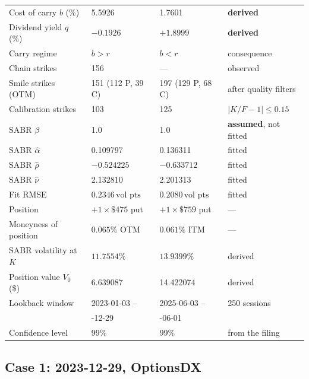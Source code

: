 \documentclass[11pt]{article}
\newcommand{\vp}{\,\text{vol pts}}
\begin{document}
\begin{table}[t]
\begin{tabular}{llll}
Cost of carry $b$ (\%)   & 5.5926             & 1.7601              & \textbf{derived} \\
Dividend yield $q$ (\%)  & $-0.1926$          & $+1.8999$           & \textbf{derived} \\
Carry regime             & $b>r$              & $b<r$               & consequence \\
\midrule
Chain strikes            & 156                & ---                 & observed \\
Smile strikes (OTM)      & 151 (112 P, 39 C)  & 197 (129 P, 68 C)   & after quality filters \\
Calibration strikes      & 103                & 125                 & $|K/F-1|\le0.15$ \\
SABR $\beta$             & 1.0                & 1.0                 & \textbf{assumed}, not fitted \\
SABR $\hat{\alpha}$      & 0.109797           & 0.136311            & fitted \\
SABR $\hat{\rho}$        & $-0.524225$        & $-0.633712$         & fitted \\
SABR $\hat{\nu}$         & 2.132810           & 2.201313            & fitted \\
Fit RMSE                 & $0.2346\vp$        & $0.2080\vp$         & fitted \\
\midrule
Position                 & $+1\times\$475$ put & $+1\times\$759$ put & --- \\
Moneyness of position    & $0.065\%$ OTM      & $0.061\%$ ITM       & --- \\
SABR volatility at $K$   & $11.7554\%$        & $13.9399\%$         & derived \\
Position value $V_0$ (\$)& 6.639087           & 14.422074           & derived \\
Lookback window          & 2023-01-03 --                   & 2025-06-03 --                   & 250 sessions \\
                         & \quad 2023-12-29               & \quad 2026-06-01               &              \\
Confidence level         & 99\%               & 99\%                & from the filing \\
\bottomrule
\end{tabular}
\end{table}

\subsection{Case 1: 2023-12-29, OptionsDX}
\label{sec:case1}
\end{document}
